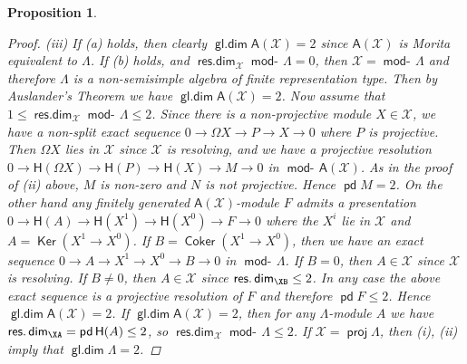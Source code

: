 \documentclass[oneside, a4paper,reqno]{amsart}
\numberwithin{equation}{section}
\newtheorem{prop}[thm]{Proposition}
\theoremstyle{definition}
\begin{document}
\begin{prop}
\begin{proof}
(iii) If (a) holds, then clearly $\operatorname*{\mathsf{gl.dim}}\mathsf{A}({\mathcal X}) = 2$ since
$\mathsf{A}({\mathcal X})$ is Morita equivalent to  $\Lambda$. If (b) holds,
and $\operatorname*{\mathsf{res.dim}}_{\mathcal X} \operatorname*{\mathsf{mod}-\!}\Lambda = 0$, then ${\mathcal X} = \operatorname*{\mathsf{mod}-\!}\Lambda$ and
therefore $\Lambda$ is a non-semisimple algebra of finite
representation type. Then  by Auslander's Theorem
\cite{Auslander:queen} we have $\operatorname*{\mathsf{gl.dim}}\mathsf{A}({\mathcal X}) = 2$. Now assume
that $1 \leq \operatorname*{\mathsf{res.dim}}_{\mathcal X}\operatorname*{\mathsf{mod}-\!}\Lambda \leq 2$. Since there is a
non-projective module $X\in {\mathcal X}$, we have a non-split exact sequence
$0 {\longrightarrow} \Omega X {\longrightarrow} P {\longrightarrow} X {\longrightarrow} 0$ where $P$ is projective. Then
$\Omega X$ lies in ${\mathcal X}$ since ${\mathcal X}$ is resolving, and  we have a
projective resolution $0 {\longrightarrow} \mathsf{H}(\Omega X) {\longrightarrow}
\mathsf{H}(P) {\longrightarrow} \mathsf{H}(X) {\longrightarrow} M {\longrightarrow} 0$ in
$\operatorname*{\mathsf{mod}-\!}\mathsf{A}({\mathcal X})$. As in the proof of (ii) above, $M$ is
non-zero and $N$ is not projective. Hence $\operatorname{\mathsf{pd}} M = 2$. On the other
hand any finitely generated $\mathsf{A}({\mathcal X})$-module $F$ admits a
presentation $0 {\longrightarrow} \mathsf{H}(A) {\longrightarrow} \mathsf{H}(X^{1}) {\longrightarrow}
\mathsf{H}(X^{0}) {\longrightarrow} F {\longrightarrow} 0$ where the $X^{i}$ lie in ${\mathcal X}$ and
$A = \operatorname*{\mathsf{Ker}}(X^{1} \to X^{0})$.  If $B = \operatorname*{\mathsf{Coker}}(X^{1} \to X^{0})$, then
we have an exact sequence $0 {\longrightarrow} A {\longrightarrow} X^{1} {\longrightarrow} X^{0} {\longrightarrow} B
{\longrightarrow} 0$ in $\operatorname*{\mathsf{mod}-\!}\Lambda$. If $B = 0$, then $A \in{\mathcal X}$ since ${\mathcal X}$ is
resolving. If $B\neq 0$, then $A\in{\mathcal X}$ since $\operatorname*{\mathsf{res.dim}}_\XB \leq 2$. In
any case the above exact sequence is a projective resolution of $F$
and therefore $\operatorname{\mathsf{pd}} F \leq 2$. Hence $\operatorname*{\mathsf{gl.dim}} \mathsf{A}({\mathcal X}) = 2$. If
$\operatorname*{\mathsf{gl.dim}}\mathsf{A}({\mathcal X}) = 2$, then for any $\Lambda$-module $A$ we have
$\operatorname*{\mathsf{res.dim}}_\XA = \operatorname{\mathsf{pd}}\mathsf{H}(A) \leq 2$, so $\operatorname*{\mathsf{res.dim}}_{\mathcal X}\operatorname*{\mathsf{mod}-\!}\Lambda \leq
2$. If ${\mathcal X} = \operatorname*{\mathsf{proj}}\Lambda$, then (i), (ii) imply that $\operatorname*{\mathsf{gl.dim}}\Lambda =
2$.


\end{proof}
\end{prop}
\end{document}
